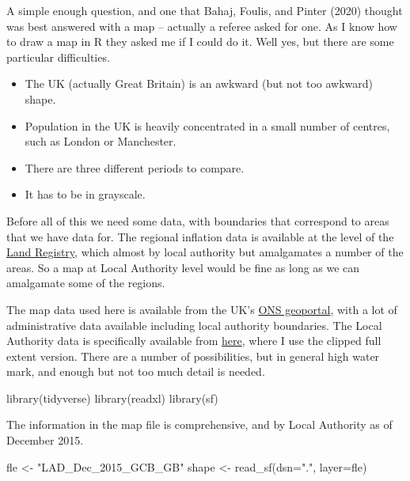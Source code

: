 \documentclass[
  letterpaper,
]{book}
\newenvironment{Shaded}{\begin{snugshade}}{\end{snugshade}}
\newcommand{\AttributeTok}[1]{\textcolor[rgb]{0.40,0.45,0.13}{#1}}
\newcommand{\FunctionTok}[1]{\textcolor[rgb]{0.28,0.35,0.67}{#1}}
\newcommand{\NormalTok}[1]{\textcolor[rgb]{0.00,0.23,0.31}{#1}}
\newcommand{\OtherTok}[1]{\textcolor[rgb]{0.00,0.23,0.31}{#1}}
\newcommand{\StringTok}[1]{\textcolor[rgb]{0.13,0.47,0.30}{#1}}
\providecommand{\tightlist}{%
  \setlength{\itemsep}{0pt}\setlength{\parskip}{0pt}}\usepackage{longtable,booktabs,array}
\begin{document}
A simple enough question, and one that Bahaj, Foulis, and Pinter
(2020) thought was best answered with a map
-- actually a referee asked for one. As I know how to draw a map in R
they asked me if I could do it. Well yes, but there are some particular
difficulties.

\begin{itemize}
\tightlist
\item
  The UK (actually Great Britain) is an awkward (but not too awkward)
  shape.
\item
  Population in the UK is heavily concentrated in a small number of
  centres, such as London or Manchester.
\item
  There are three different periods to compare.
\item
  It has to be in grayscale.
\end{itemize}

Before all of this we need some data, with boundaries that correspond to
areas that we have data for. The regional inflation data is available at
the level of the
\href{https://www.gov.uk/government/organisations/land-registry}{Land
Registry}, which almost by local authority but amalgamates a number of
the areas. So a map at Local Authority level would be fine as long as we
can amalgamate some of the regions.

The map data used here is available from the UK's
\href{https://geoportal.statistics.gov.uk/}{ONS
geoportal}, with a lot of administrative data
available including local authority boundaries. The Local Authority data
is specifically available from
\href{https://geoportal.statistics.gov.uk/maps/lad-dec-2015-generalised-clipped-boundaries-gb}{here},
where I use the clipped full extent version. There are a number of
possibilities, but in general high water mark, and enough but not too
much detail is needed.

\begin{Shaded}
\begin{Highlighting}[]
\FunctionTok{library}\NormalTok{(tidyverse)}
\FunctionTok{library}\NormalTok{(readxl)}
\FunctionTok{library}\NormalTok{(sf)}
\end{Highlighting}
\end{Shaded}

The information in the map file is comprehensive, and by Local Authority
as of December 2015.

\begin{Shaded}
\begin{Highlighting}[]
\NormalTok{fle }\OtherTok{\textless{}{-}} \StringTok{"LAD\_Dec\_2015\_GCB\_GB"}
\NormalTok{shape }\OtherTok{\textless{}{-}} \FunctionTok{read\_sf}\NormalTok{(}\AttributeTok{dsn=}\StringTok{"."}\NormalTok{, }\AttributeTok{layer=}\NormalTok{fle)}
\end{Highlighting}
\end{Shaded}
\end{document}
